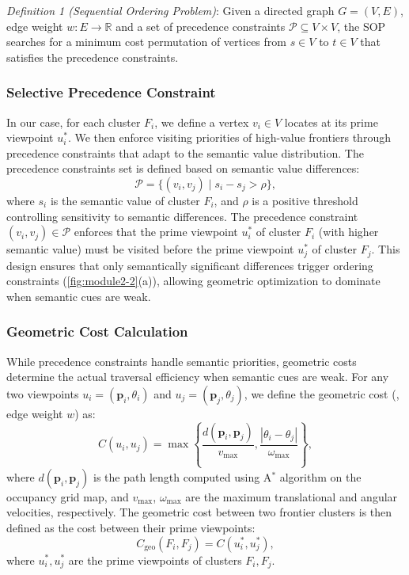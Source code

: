 \textit{Definition 1 (Sequential Ordering Problem)}:
Given a directed graph $G = (V, E)$, edge weight $w : E \to \mathbb{R}$ and a set of precedence constraints $\mathcal{P} \subseteq V \times V$, the SOP searches for a minimum cost permutation of vertices from $s \in V$ to $t \in V$ that satisfies the precedence constraints.


\subsubsection{Selective Precedence Constraint}
In our case, for each cluster $F_i$, we define a vertex $v_i \in V$ locates at its prime viewpoint $u_i^*$. 
We then enforce visiting priorities of high-value frontiers through precedence constraints that adapt to the semantic value distribution.
The precedence constraints set is defined based on semantic value differences:
\begin{equation}
    \mathcal{P} = \{(v_i,v_j) \mid s_i - s_j > \rho \},
\end{equation}
where $s_i$ is the semantic value of cluster $F_i$, and $\rho$ is a positive threshold controlling sensitivity to semantic differences. 
The precedence constraint $(v_i,v_j) \in \mathcal{P}$ enforces that the prime viewpoint $u_i^*$ of cluster $F_i$ (with higher semantic value) must be visited before the prime viewpoint $u_j^*$ of cluster $F_j$.
This design ensures that only semantically significant differences trigger ordering constraints (\fig\ref{fig:module2-2}(a)), allowing geometric optimization to dominate when semantic cues are weak.


\subsubsection{Geometric Cost Calculation}
While precedence constraints handle semantic priorities, geometric costs determine the actual traversal efficiency when semantic cues are weak.
For any two viewpoints $u_i = (\mathbf{p}_i, \theta_i)$ and $u_j = (\mathbf{p}_j, \theta_j)$, we define the geometric cost (\ie, edge weight $w$) as:
\begin{equation}
    C(u_i, u_j) = \max\left\{\frac{d(\mathbf{p}_i, \mathbf{p}_j)}{v_{\max}}, \frac{|\theta_i - \theta_j|}{\omega_{\max}}\right\},
\label{eq:cost}
\end{equation}
where $d(\mathbf{p}_i, \mathbf{p}_j)$ is the path length computed using A$^*$ algorithm on the occupancy grid map, and $v_{\max}$, $\omega_{\max}$ are the maximum translational and angular velocities, respectively. The geometric cost between two frontier clusters is then defined as the cost between their prime viewpoints:
\begin{equation}
    C_{\text{geo}}(F_i, F_j) = C(u_i^*, u_j^*),
\end{equation}
where $u_i^*, u_j^*$ are the prime viewpoints of clusters $F_i, F_j$.

